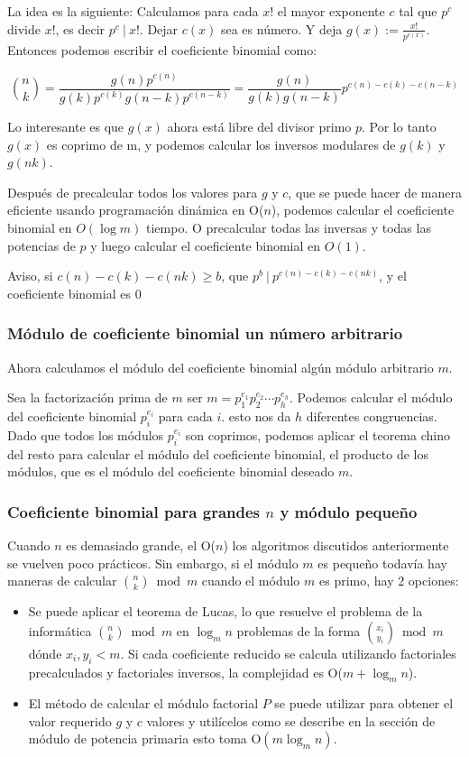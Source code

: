 La idea es la siguiente: Calculamos para cada $x!$ el mayor exponente $c$ tal que $p^c$ divide $x!$, es decir $p^c ~|~ x!$. Dejar $c(x)$ sea es número. Y deja $g(x) := \frac{x!}{p^{c(x)}}$. Entonces podemos escribir el coeficiente binomial como:

$$\binom n k = \frac {g(n) p^{c(n)}} {g(k) p^{c(k)} g(n-k) p^{c(n-k)}} = \frac {g(n)} {g(k) g(n-k)}p^{c(n) - c(k) - c(n-k)}$$

Lo interesante es que $g(x)$ ahora está libre del divisor primo $p$. Por lo tanto $g(x)$ es coprimo de m, y podemos calcular los inversos modulares de $g(k)$ y $g(nk)$.

Después de precalcular todos los valores para $g$ y $c$, que se puede hacer de manera eficiente usando programación dinámica en O($n$), podemos calcular el coeficiente binomial en $O(\log m)$
tiempo. O precalcular todas las inversas y todas las potencias de $p$ y luego calcular el coeficiente binomial en $O(1)$.

Aviso, si $c(n) - c(k) - c(nk) \ge b$, que $p^b ~|~ p^{c(n) - c(k) - c(nk)}$, y el coeficiente binomial es $0$

\subsubsection{Módulo de coeficiente binomial un número arbitrario}

Ahora calculamos el módulo del coeficiente binomial algún módulo arbitrario $m$.

Sea la factorización prima de $m$ ser $m=p_1^{e_1} p_2^{e_2} \cdots p_h^{e_h}$. Podemos calcular el módulo del coeficiente binomial $p_i^{e_i}$ para cada $i$. esto nos da $h$ diferentes 
congruencias. Dado que todos los módulos $p_i^{e_i}$ son coprimos, podemos aplicar el teorema chino del resto para calcular el módulo del coeficiente binomial, el producto de los módulos, que es 
el módulo del coeficiente binomial deseado $m$.

\subsubsection{Coeficiente binomial para grandes $n$ y módulo pequeño}

Cuando $n$ es demasiado grande, el O($n$) los algoritmos discutidos anteriormente se vuelven poco prácticos. Sin embargo, si el módulo $m$ es pequeño todavía hay maneras de calcular $\binom{n}{k} \bmod m$ cuando el módulo $m$ es primo, hay 2 opciones:

\begin{itemize}
	\item Se puede aplicar el teorema de Lucas, lo que resuelve el problema de la informática $\binom{n}{k} \bmod m$ en $\log_mn$ problemas de la forma $\binom{x_i}{y_i} \bmod m$
	dónde $x_i, y_i < m$. Si cada coeficiente reducido se calcula utilizando factoriales precalculados y factoriales inversos, la complejidad es O($m + \log_m n$).
	\item El método de calcular el módulo factorial $P$ se puede utilizar para obtener el valor requerido $g$ y $c$ valores y utilícelos como se describe en la sección de módulo de potencia 
	primaria esto toma O$(m \log_m n)$.
\end{itemize}

